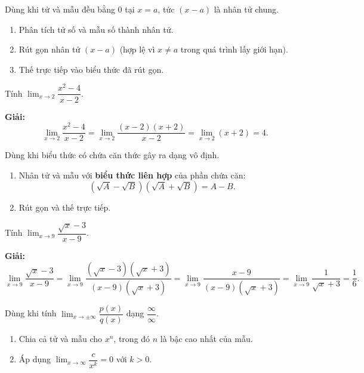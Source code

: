 \documentclass[12pt,a4paper]{article}
\begin{document}
\begin{phuongphap}[title={Kỹ thuật 1: Phân tích nhân tử (Factoring)}]
  Dùng khi tử và mẫu đều bằng $0$ tại $x = a$, tức $(x - a)$ là nhân tử chung.
  \begin{enumerate}
    \item Phân tích tử số và mẫu số thành nhân tử.
    \item Rút gọn nhân tử $(x-a)$ (hợp lệ vì $x \ne a$ trong quá trình lấy giới hạn).
    \item Thế trực tiếp vào biểu thức đã rút gọn.
  \end{enumerate}
\end{phuongphap}

\begin{vidu}
  Tính $\displaystyle\lim_{x \to 2} \dfrac{x^2 - 4}{x - 2}$.

  \medskip\textbf{Giải:}
  \[
    \lim_{x \to 2} \dfrac{x^2 - 4}{x - 2} = \lim_{x \to 2} \dfrac{(x-2)(x+2)}{x-2} = \lim_{x \to 2} (x + 2) = 4.
  \]
\end{vidu}

\begin{phuongphap}[title={Kỹ thuật 2: Nhân liên hợp (Rationalizing)}]
  Dùng khi biểu thức có chứa căn thức gây ra dạng vô định.
  \begin{enumerate}
    \item Nhân tử và mẫu với \textbf{biểu thức liên hợp} của phần chứa căn:
      \[
        (\sqrt{A} - \sqrt{B})(\sqrt{A} + \sqrt{B}) = A - B.
      \]
    \item Rút gọn và thế trực tiếp.
  \end{enumerate}
\end{phuongphap}

\begin{vidu}
  Tính $\displaystyle\lim_{x \to 9} \dfrac{\sqrt{x} - 3}{x - 9}$.

  \medskip\textbf{Giải:}
  \[
    \lim_{x \to 9} \dfrac{\sqrt{x} - 3}{x - 9}
    = \lim_{x \to 9} \dfrac{(\sqrt{x} - 3)(\sqrt{x} + 3)}{(x - 9)(\sqrt{x} + 3)}
    = \lim_{x \to 9} \dfrac{x - 9}{(x - 9)(\sqrt{x} + 3)}
    = \lim_{x \to 9} \dfrac{1}{\sqrt{x} + 3}
    = \dfrac{1}{6}.
  \]
\end{vidu}

\begin{phuongphap}[title={Kỹ thuật 3: Chia cho lũy thừa bậc cao nhất (với $x \to \infty$)}]
  Dùng khi tính $\displaystyle\lim_{x \to \pm\infty} \dfrac{p(x)}{q(x)}$ dạng $\dfrac{\infty}{\infty}$.
  \begin{enumerate}
    \item Chia cả tử và mẫu cho $x^n$, trong đó $n$ là bậc cao nhất của mẫu.
    \item Áp dụng $\displaystyle\lim_{x \to \infty} \dfrac{c}{x^k} = 0$ với $k > 0$.
  \end{enumerate}
\end{phuongphap}
\end{document}

